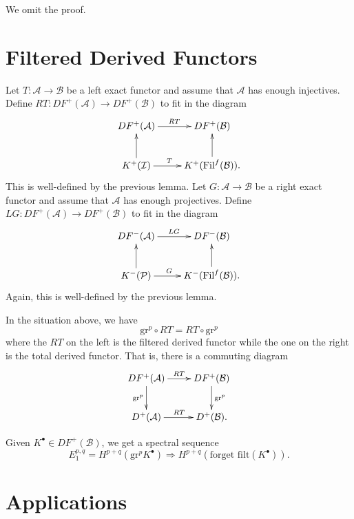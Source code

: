 We omit the proof.

\section{Filtered Derived Functors}

\begin{definition}
Let $T: \mathcal{A} \to \mathcal{B}$ be a left exact functor and assume that 
$\mathcal{A}$ has enough injectives.  Define $RT: D F^+(\mathcal{A}) \to D 
F^+(\mathcal{B})$ to fit in the diagram
$$
\xymatrix{ 
D F^+(\mathcal{A}) \ar^{RT}[r] & D F^+(\mathcal{B}) \\
K^+(\mathcal{I}) \ar[u] \ar[r]^{T \quad} & K^+(\text{Fil}^f(\mathcal{B})). 
\ar[u]}
$$
This is well-defined by the previous lemma. Let $G: \mathcal{A} \to 
\mathcal{B}$ be a right exact functor  and assume that $\mathcal{A}$ has enough 
projectives.  Define $LG: D F^+(\mathcal{A}) \to D F^+(\mathcal{B})$ to fit in 
the diagram
$$
\xymatrix{ 
D F^-(\mathcal{A}) \ar^{LG}[r] & D F^-(\mathcal{B}) \\
K^-(\mathcal{P}) \ar[u] \ar[r]^{G \quad} & K^-(\text{Fil}^f(\mathcal{B})). 
\ar[u]}
$$
Again, this is well-defined by the previous lemma.
\end{definition}

\begin{proposition}
In the situation above, we have
$$
\mathrm{gr}^p \circ RT = RT \circ \mathrm{gr}^p
$$
where the $RT$ on the left is the filtered derived functor while the one on the 
right is the total derived functor. That is, there is a commuting diagram
$$
\xymatrix{
D F^+(\mathcal{A}) \ar[r]^{RT} \ar[d]_{\text{gr}^p} & D F^+(\mathcal{B}) 
\ar[d]^{\text{gr}^p}\\
D^+(\mathcal{A}) \ar[r]^{RT} & D^+(\mathcal{B}).}
$$
\end{proposition}

Given $K^\bullet \in D F^+(\mathcal{B})$, we get a spectral sequence 
$$
E_1^{p,q} = H^{p+q}(\text{gr}^p K^\bullet) \Rightarrow H^{p+q}(\text{forget 
filt}(K^\bullet)).
$$

\section{Applications}

